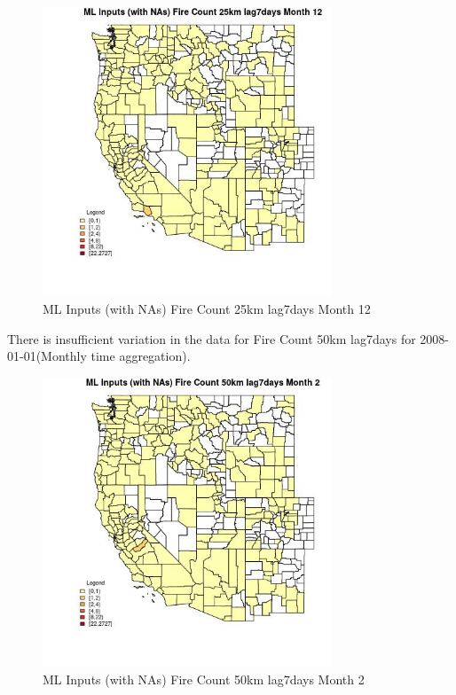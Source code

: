 \begin{figure} 
\centering  
\includegraphics[width=0.77\textwidth]{Code_Outputs/Report_ML_input_PM25_Step4_part_f_de_duplicated_aves_prioritize_24hr_obswNAs_CountyFire_Count_25km_lag7daysmedianMonth12.jpg} 
\caption{\label{fig:Report_ML_input_PM25_Step4_part_f_de_duplicated_aves_prioritize_24hr_obswNAsCountyFire_Count_25km_lag7daysmedianMonth12}ML Inputs (with NAs) Fire Count 25km lag7days Month 12} 
\end{figure} 
 

There is insufficient variation in the data for Fire Count 50km lag7days for 2008-01-01(Monthly time aggregation). 
 

\begin{figure} 
\centering  
\includegraphics[width=0.77\textwidth]{Code_Outputs/Report_ML_input_PM25_Step4_part_f_de_duplicated_aves_prioritize_24hr_obswNAs_CountyFire_Count_50km_lag7daysmedianMonth2.jpg} 
\caption{\label{fig:Report_ML_input_PM25_Step4_part_f_de_duplicated_aves_prioritize_24hr_obswNAsCountyFire_Count_50km_lag7daysmedianMonth2}ML Inputs (with NAs) Fire Count 50km lag7days Month 2} 
\end{figure} 
 

